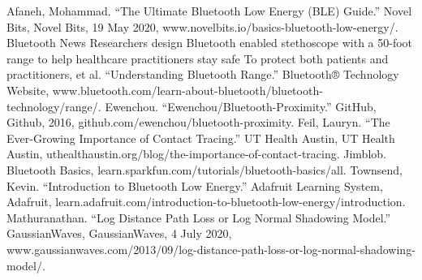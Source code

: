 \documentclass[letterpaper, 10 pt, conference]{ieeeconf}  %
\begin{document}










\begin{thebibliography}{99}

 Afaneh, Mohammad. “The Ultimate Bluetooth Low Energy (BLE) Guide.” Novel Bits, Novel Bits, 19 May 2020, www.novelbits.io/basics-bluetooth-low-energy/.
 Bluetooth News	Researchers design Bluetooth enabled stethoscope with a 50-foot range to help healthcare practitioners stay safe To protect both patients and practitioners, et al. “Understanding Bluetooth Range.” Bluetooth® Technology Website, www.bluetooth.com/learn-about-bluetooth/bluetooth-technology/range/.
 Ewenchou. “Ewenchou/Bluetooth-Proximity.” GitHub, Github, 2016, github.com/ewenchou/bluetooth-proximity.
 Feil, Lauryn. “The Ever-Growing Importance of Contact Tracing.” UT Health Austin, UT Health Austin, uthealthaustin.org/blog/the-importance-of-contact-tracing.
 Jimblob. Bluetooth Basics, learn.sparkfun.com/tutorials/bluetooth-basics/all.
 Townsend, Kevin. “Introduction to Bluetooth Low Energy.” Adafruit Learning System, Adafruit, learn.adafruit.com/introduction-to-bluetooth-low-energy/introduction.
 Mathuranathan. “Log Distance Path Loss or Log Normal Shadowing Model.” GaussianWaves, GaussianWaves, 4 July 2020, www.gaussianwaves.com/2013/09/log-distance-path-loss-or-log-normal-shadowing-model/.





\end{thebibliography}
\end{document}
